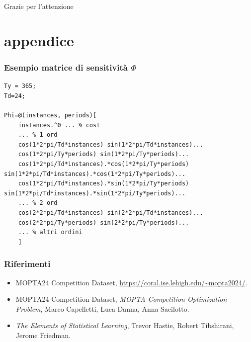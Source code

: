 \documentclass{beamer}
\begin{document}
\begin{frame}
\begin{overlayarea}{\textwidth}{\textheight}
    \end{overlayarea}
\end{frame}

\begin{frame}
\Huge{\centerline{Grazie per l'attenzione}}
\end{frame}


\appendix
\setcounter{page}{1}
\renewcommand{\thepage}{A\arabic{page}}


\section{appendice}

\begin{frame}[fragile]
    \frametitle{Esempio matrice di sensitività $\Phi$}
\small 
\begin{lstlisting}
Ty = 365;
Td=24;

Phi=@(instances, periods)[
    instances.^0 ... % cost
    ... % 1 ord
    cos(1*2*pi/Td*instances) sin(1*2*pi/Td*instances)...
    cos(1*2*pi/Ty*periods) sin(1*2*pi/Ty*periods)...
    cos(1*2*pi/Td*instances).*cos(1*2*pi/Ty*periods) sin(1*2*pi/Td*instances).*cos(1*2*pi/Ty*periods)...
    cos(1*2*pi/Td*instances).*sin(1*2*pi/Ty*periods) sin(1*2*pi/Td*instances).*sin(1*2*pi/Ty*periods)...
    ... % 2 ord
    cos(2*2*pi/Td*instances) sin(2*2*pi/Td*instances)... 
    cos(2*2*pi/Ty*periods) sin(2*2*pi/Ty*periods)...
    ... % altri ordini
    ]
\end{lstlisting}
    
\end{frame}

\begin{frame}
    \frametitle{Riferimenti}

    \begin{itemize}
        \item MOPTA24 Competition Dataset, \url{https://coral.ise.lehigh.edu/~mopta2024/}.
        \vspace{0.3cm}
        \item MOPTA24 Competition Dataset, \textit{MOPTA Competition Optimization Problem}, Marco Capelletti, Luca Danna, Anna Sacilotto.
        \vspace{0.3cm}
        \item \textit{The Elements of
Statistical Learning}, Trevor Hastie, Robert Tibshirani, Jerome Friedman.
    \end{itemize}
\end{frame}
\end{document}
